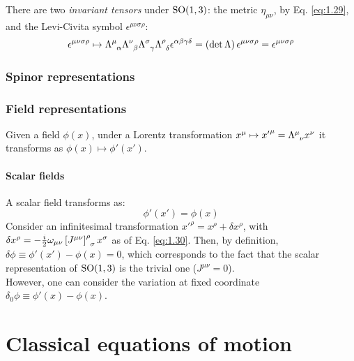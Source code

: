 There are two \textit{invariant tensors} under $ \mathrm{SO}(1,3) $: the metric $ \eta_{\mu \nu} $, by Eq. \ref{eq:1.29}, and the Levi-Civita symbol $ \epsilon^{\mu \nu \sigma \rho} $:
\begin{equation*}
  \epsilon^{\mu \nu \sigma \rho} \mapsto \tensor{\Lambda}{^\mu_\alpha} \tensor{\Lambda}{^\nu_\beta} \tensor{\Lambda}{^\sigma_\gamma} \tensor{\Lambda}{^\rho_\delta} \epsilon^{\alpha \beta \gamma \delta} = \left( \det \Lambda \right) \epsilon^{\mu \nu \sigma \rho} = \epsilon^{\mu \nu \sigma \rho}
\end{equation*}


\subsubsection{Spinor representations}




\subsubsection{Field representations}

Given a field $ \phi(x) $, under a Lorentz transformation $ x^\mu \mapsto {x'}^\mu = \tensor{\Lambda}{^\mu_\nu} x^\nu $ it transforms as $ \phi(x) \mapsto \phi'(x') $.

\paragraph{Scalar fields}

A scalar field transforms as:
\begin{equation}
  \phi'(x') = \phi(x)
  \label{eq:1.40}
\end{equation}
Consider an infinitesimal transformation $ x'^\rho = x^\rho + \delta x^\rho $, with $ \delta x^\rho = - \frac{i}{2} \omega_{\mu \nu} \tensor{\left[ J^{\mu \nu} \right]}{^\rho_\sigma} x^\sigma $ as of Eq. \ref{eq:1.30}. Then, by definition, $ \delta \phi \equiv \phi'(x') - \phi(x) = 0 $, which corresponds to the fact that the scalar representation of $ \mathrm{SO}(1,3) $ is the trivial one ($ J^{\mu \nu} = 0 $).\\
However, one can consider the variation at fixed coordinate $ \delta_0 \phi \equiv \phi'(x) - \phi(x) $.










\newpage

\section{Classical equations of motion}

